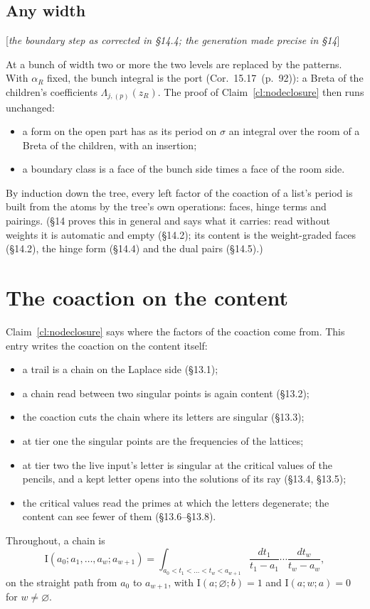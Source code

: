 \documentclass[11pt]{article}
\newcommand{\status}[1]{\hfill{\small[\textit{#1}]}}
\newcommand{\hb}[2]{#1~(p.~#2)}   %
\theoremstyle{plain}
\theoremstyle{remark}
\begin{document}
\subsection{Any width}\status{the boundary step as corrected in \S14.4; the generation made precise in \S14}

At a bunch of width two or more the two levels are replaced by the patterns. With $\alpha_R$ fixed, the bunch integral is the port (Cor.~\hb{15.17}{92}): a Breta of the children's coefficients $\Lambda_{j,(p)}(z_R)$. The proof of Claim~\ref{cl:nodeclosure} then runs unchanged:
\begin{itemize}
\item a form on the open part has as its period on $\sigma$ an integral over the room of a Breta of the children, with an insertion;
\item a boundary class is a face of the bunch side times a face of the room side.
\end{itemize}
By induction down the tree, every left factor of the coaction of a list's period is built from the atoms by the tree's own operations: faces, hinge terms and pairings. (\S14 proves this in general and says what it carries: read without weights it is automatic and empty (\S14.2); its content is the weight-graded faces (\S14.2), the hinge form (\S14.4) and the dual pairs (\S14.5).)

\section{The coaction on the content}

Claim~\ref{cl:nodeclosure} says where the factors of the coaction come from. This entry writes the coaction on the content itself:
\begin{itemize}
\item a trail is a chain on the Laplace side (\S13.1);
\item a chain read between two singular points is again content (\S13.2);
\item the coaction cuts the chain where its letters are singular (\S13.3);
\item at tier one the singular points are the frequencies of the lattices;
\item at tier two the live input's letter is singular at the critical values of the pencils, and a kept letter opens into the solutions of its ray (\S13.4, \S13.5);
\item the critical values read the primes at which the letters degenerate; the content can see fewer of them (\S13.6--\S13.8).
\end{itemize}
Throughout, a chain is
\[
\mathrm I(a_0;a_1,\dots,a_w;a_{w+1})=\int_{a_0<t_1<\dots<t_w<a_{w+1}}\frac{dt_1}{t_1-a_1}\cdots\frac{dt_w}{t_w-a_w},
\]
on the straight path from $a_0$ to $a_{w+1}$, with $\mathrm I(a;\varnothing;b)=1$ and $\mathrm I(a;w;a)=0$ for $w\neq\varnothing$.
\end{document}
